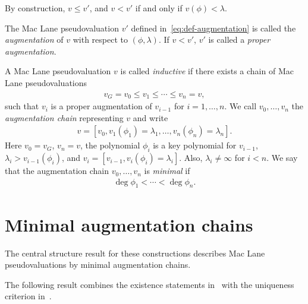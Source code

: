 By construction, $v\leq v'$, and $v < v'$ if and only if $v(\phi) < \lambda$.

\begin{definition}
    The Mac Lane pseudovaluation $v'$ defined in~\eqref{eq:def-augmentation} is called the \textit{augmentation} of $v$ with respect to $(\phi,\lambda)$.
    If $v < v'$, $v'$ is called a \textit{proper augmentation}.
\end{definition}

\begin{definition}
    A Mac Lane pseudovaluation $v$ is called \textit{inductive} if there exists a chain of Mac Lane pseudovaluations
    \begin{align}
        v_{\scriptscriptstyle G} = v_0 \leq v_1 \leq \cdots \leq v_n = v,
    \end{align}
    such that $v_i$ is a proper augmentation of $v_{i-1}$ for $i=1,\dots, n$.
    We call $v_0,\dots,v_n$ the \textit{augmentation chain} representing $v$ and write \begin{align}
        v = [v_0,v_1(\phi_1) = \lambda_1,\dots, v_n(\phi_n) = \lambda_n].
    \end{align}
    Here $v_0 = v_{\scriptscriptstyle G}$, $v_n = v$, the polynomial $\phi_i$ is a key polynomial for $v_{i-1}$, $\lambda_i > v_{i-1}(\phi_i)$,
    and $v_i = [v_{i-1}, v_i(\phi_i) = \lambda_i]$.
    Also, $\lambda_i \neq \infty$ for $i < n$.
    We say that the augmentation chain $v_0,\dots,v_n$ is \textit{minimal} if
    \begin{align}
        \deg \phi_1 < \cdots < \deg \phi_n.
    \end{align}
\end{definition}


\section{Minimal augmentation chains}\label{sec:minimal-augmentation-chains}
The central structure result for these constructions describes Mac Lane pseudovaluations by minimal augmentation chains.

The following result combines the existence statements in~\cite[Theorem 4.31 and Corollary 4.67]{Rueth} with the uniqueness criterion in~\cite[Theorem 4.33]{Rueth}.

